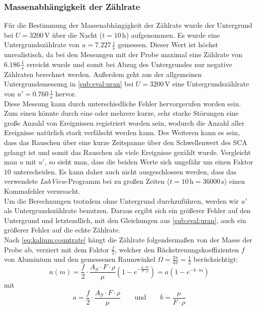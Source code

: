 \subsubsection{Massenabhängigkeit der Zählrate}
\label{subsub:kalium:massdep}
Für die Bestimmung der Massenabhängigkeit der Zählrate wurde der Untergrund bei $U=3200\,$V über die Nacht ($t=10\,$h) aufgenommen. Es wurde eine 
Untergrundszählrate von $u=7.227\,\frac{1}{\text{s}}$ gemessen. Dieser Wert ist höchst unrealistisch, da bei den Messungen mit der Probe 
maximal eine Zählrate von $6.186\,\frac{1}{\text{s}}$ erreicht wurde und somit bei Abzug des Untergrundes nur negative Zählraten berechnet werden. Außerdem 
geht aus der allgemeinen Untergrundsmessung in \ref{sub:eval:uran} bei $U=3200\,$V  eine Untergrundszählrate von $u'=0.760\,\frac{1}{\text{s}}$ 
hervor. \\ 
Diese Messung kann durch unterschiedliche Fehler hervorgerufen worden sein. Zum einen könnte durch eine oder mehrere kurze, sehr starke 
Störungen eine große Anzahl von Ereignissen registriert worden sein, wodurch die Anzahl aller Ereignisse natürlich stark verfälscht werden kann. Des 
Weiteren kann es sein, dass das Rauschen über eine kurze Zeitspanne über den Schwellenwert des SCA gelangt ist und somit das Rauschen als viele 
Ereignisse gezählt wurde. Vergleicht man $u$ mit $u'$, so sieht man, dass die beiden Werte sich ungefähr um einen Faktor $10$ unterscheiden. Es kann 
daher auch nicht ausgeschlossen werden, dass das verwendete \emph{LabView}-Programm bei zu großen Zeiten ($t=10\,\text{h} = 36000\,\text{s}$) 
einen Kommafehler verursacht. \\
Um die Berechnungen trotzdem ohne Untergrund durchzuführen, werden wir $u'$ als Untergrundszählrate benutzen. Daraus ergibt sich ein größerer 
Fehler auf den Untergrund und letztendlich, mit den Gleichungen aus \ref{sub:eval:uran}, auch ein größerer Fehler auf die echte Zählrate.\\[\baselineskip]
Nach \autoref{eq:kalium:countrate} hängt die Zählrate folgendermaßen von der Masse der Probe ab, verziert mit dem Faktor $\frac{f}{2}$, welcher 
den Rückstreuungskoeffizienten $f$ von Aluminium und den gemessenen Raumwinkel $\Omega = \frac{2 \pi}{4 \pi} = \frac{1}{2}$ berücksichtigt:
\begin{equation}
  n(m) = \frac{f}{2} \cdot \frac{A_S \cdot F \cdot \rho}{\mu} \left( 1 - e^{- \frac{\mu \cdot m}{F \cdot \rho}} \right) = a(1-e^{-b \cdot m})
\end{equation}
mit
\begin{equation}
  a = \frac{f}{2} \cdot \frac{A_S \cdot F \cdot \rho}{\mu} \qquad \text{und} \qquad b = \frac{\mu}{F \cdot \rho}
\end{equation}
